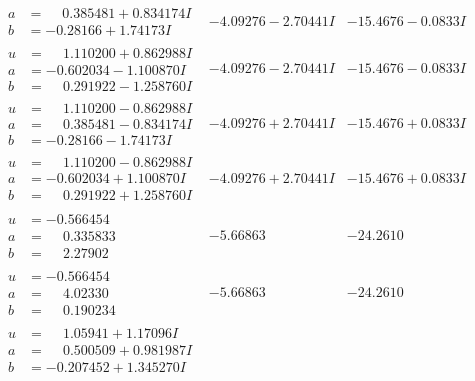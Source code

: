 \documentclass[1p]{elsarticle_modified}
\theoremstyle{definition}
\begin{document}
$$\begin{array}{c|c|c}
\begin{aligned}
a &= \phantom{-}0.385481 + 0.834174 I \\
b &= -0.28166 + 1.74173 I\end{aligned}
 & -4.09276 - 2.70441 I & -15.4676 - 0.0833 I \\ \hline\begin{aligned}
u &= \phantom{-}1.110200 + 0.862988 I \\
a &= -0.602034 - 1.100870 I \\
b &= \phantom{-}0.291922 - 1.258760 I\end{aligned}
 & -4.09276 - 2.70441 I & -15.4676 - 0.0833 I \\ \hline\begin{aligned}
u &= \phantom{-}1.110200 - 0.862988 I \\
a &= \phantom{-}0.385481 - 0.834174 I \\
b &= -0.28166 - 1.74173 I\end{aligned}
 & -4.09276 + 2.70441 I & -15.4676 + 0.0833 I \\ \hline\begin{aligned}
u &= \phantom{-}1.110200 - 0.862988 I \\
a &= -0.602034 + 1.100870 I \\
b &= \phantom{-}0.291922 + 1.258760 I\end{aligned}
 & -4.09276 + 2.70441 I & -15.4676 + 0.0833 I \\ \hline\begin{aligned}
u &= -0.566454\phantom{ +0.000000I} \\
a &= \phantom{-}0.335833\phantom{ +0.000000I} \\
b &= \phantom{-}2.27902\phantom{ +0.000000I}\end{aligned}
 & -5.66863\phantom{ +0.000000I} & -24.2610\phantom{ +0.000000I} \\ \hline\begin{aligned}
u &= -0.566454\phantom{ +0.000000I} \\
a &= \phantom{-}4.02330\phantom{ +0.000000I} \\
b &= \phantom{-}0.190234\phantom{ +0.000000I}\end{aligned}
 & -5.66863\phantom{ +0.000000I} & -24.2610\phantom{ +0.000000I} \\ \hline\begin{aligned}
u &= \phantom{-}1.05941 + 1.17096 I \\
a &= \phantom{-}0.500509 + 0.981987 I \\
b &= -0.207452 + 1.345270 I\end{aligned}

\end{array}$$
\end{document}
